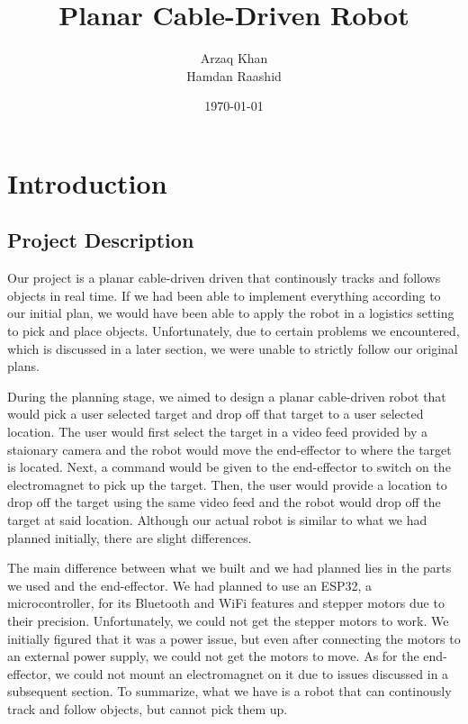 \documentclass[11pt]{article}
\title{Planar Cable-Driven Robot}
\author{Arzaq Khan \\
Hamdan Raashid \\
}
\date{\today}
\begin{document}
\maketitle


\section{Introduction}


\subsection{Project Description}
Our project is a planar cable-driven driven that continously tracks and follows objects in real time. If we had been able to
implement everything according to our initial plan, we would have been able to apply the robot in a logistics setting to pick and
place objects. Unfortunately, due to certain problems we encountered, which is discussed in a later section, we were unable to
strictly follow our original plans.

During the planning stage, we aimed to design a planar cable-driven robot that would pick a user selected target and drop off that
target to a user selected location. The user would first select the target in a video feed provided by a staionary camera and the
robot would move the end-effector to where the target is located. Next, a command would be given to the end-effector to switch on the
electromagnet to pick up the target. Then, the user would provide a location to drop off the target using
the same video feed and the robot would drop off the target at said location. 
Although our actual robot is similar to what we had planned initially, there are slight differences.

The main difference between what we built and we had planned lies in the parts we used and the end-effector. We had
planned to use an ESP32, a microcontroller, for its Bluetooth and WiFi features and stepper motors due to their precision.
Unfortunately, we could not get the stepper motors to work. We initially figured that it was a power issue, but even
after connecting the motors to an external power supply, we could not get the motors to move. As for the end-effector,
we could not mount an electromagnet on it due to issues discussed in a subsequent section. To summarize, what we have
is a robot that can continously track and follow objects, but cannot pick them up.
\end{document}

